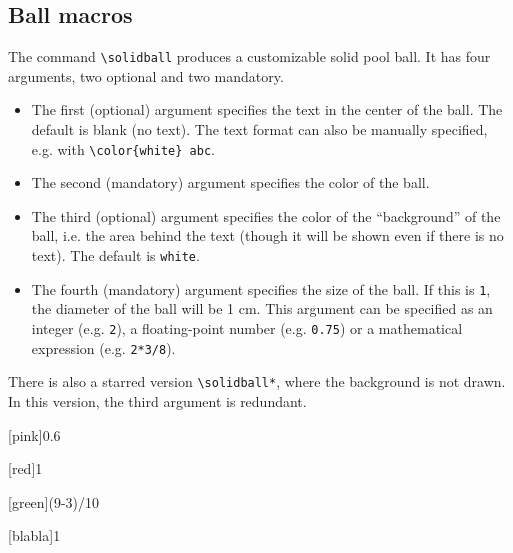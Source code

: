 \subsection{Ball macros}

The command \verb!\solidball! produces a customizable solid pool ball. It has four arguments, two optional and two mandatory.
\begin{itemize}
    \item The first (optional) argument specifies the text in the center of the ball. The default is blank (no text). The text format can also be manually specified, e.g. with \verb!\color{white} abc!.
    \item The second (mandatory) argument specifies the color of the ball.
    \item The third (optional) argument specifies the color of the ``background'' of the ball, i.e. the area behind the text (though it will be shown even if there is no text). The default is \texttt{white}.
    \item The fourth (mandatory) argument specifies the size of the ball. If this is \texttt{1}, the diameter of the ball will be 1 cm. This argument can be specified as an integer (e.g. \texttt{2}), a floating-point number (e.g. \texttt{0.75}) or a mathematical expression (e.g. \texttt{2*3/8}).
\end{itemize}

There is also a starred version \verb!\solidball*!, where the background is not drawn. In this version, the third argument is redundant.

\begin{tcolorbox}[blanker,sidebyside,before skip=10pt,after skip=10pt]
\begin{verbbox}[righthand width=1.3cm]
\end{verbbox}
\begin{verbbox}[righthand width=1.3cm]
\end{verbbox}
\begin{verbbox}[righthand width=1.3cm]
[pink]{0.6}
\end{verbbox}
\begin{verbbox}[righthand width=1.3cm]
[red]{1}
\end{verbbox}
\tcblower %
\begin{verbbox}[righthand width=1.3cm]
\end{verbbox}
\begin{verbbox}[righthand width=1.3cm]
\end{verbbox}
\begin{verbbox}[righthand width=1.3cm]
[green]{(9-3)/10}
\end{verbbox}
\begin{verbbox}[righthand width=1.3cm]
[blabla]{1}
\end{verbbox}
\end{tcolorbox}

